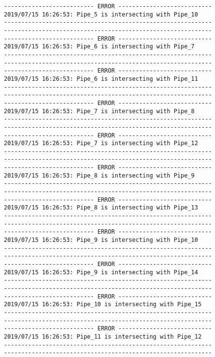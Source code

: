 \documentclass{article}
\begin{document}
{\begin{verbatim}
-------------------------- ERROR ---------------------------
2019/07/15 16:26:53: Pipe_5 is intersecting with Pipe_10
------------------------------------------------------------
------------------------------------------------------------
-------------------------- ERROR ---------------------------
2019/07/15 16:26:53: Pipe_6 is intersecting with Pipe_7
------------------------------------------------------------
------------------------------------------------------------
-------------------------- ERROR ---------------------------
2019/07/15 16:26:53: Pipe_6 is intersecting with Pipe_11
------------------------------------------------------------
------------------------------------------------------------
-------------------------- ERROR ---------------------------
2019/07/15 16:26:53: Pipe_7 is intersecting with Pipe_8
------------------------------------------------------------
------------------------------------------------------------
-------------------------- ERROR ---------------------------
2019/07/15 16:26:53: Pipe_7 is intersecting with Pipe_12
------------------------------------------------------------
------------------------------------------------------------
-------------------------- ERROR ---------------------------
2019/07/15 16:26:53: Pipe_8 is intersecting with Pipe_9
------------------------------------------------------------
------------------------------------------------------------
-------------------------- ERROR ---------------------------
2019/07/15 16:26:53: Pipe_8 is intersecting with Pipe_13
------------------------------------------------------------
------------------------------------------------------------
-------------------------- ERROR ---------------------------
2019/07/15 16:26:53: Pipe_9 is intersecting with Pipe_10
------------------------------------------------------------
------------------------------------------------------------
-------------------------- ERROR ---------------------------
2019/07/15 16:26:53: Pipe_9 is intersecting with Pipe_14
------------------------------------------------------------
------------------------------------------------------------
-------------------------- ERROR ---------------------------
2019/07/15 16:26:53: Pipe_10 is intersecting with Pipe_15
------------------------------------------------------------
------------------------------------------------------------
-------------------------- ERROR ---------------------------
2019/07/15 16:26:53: Pipe_11 is intersecting with Pipe_12
------------------------------------------------------------
------------------------------------------------------------

\end{verbatim}}
\end{document}
